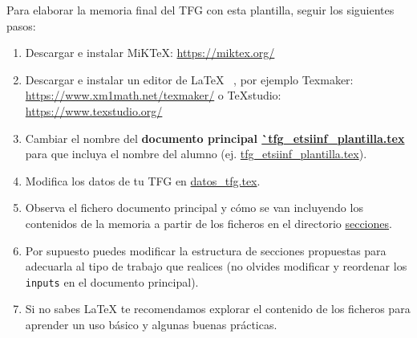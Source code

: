 Para elaborar la memoria final del TFG con esta plantilla, seguir los siguientes pasos:
\begin{enumerate}
\item Descargar e instalar MiKTeX:  \url{https://miktex.org/}
\item Descargar e instalar un editor de \LaTeX~ , por ejemplo Texmaker:
\url{https://www.xm1math.net/texmaker/} o TeXstudio: \url{https://www.texstudio.org/}
\item Cambiar el nombre del \textbf{documento principal
    \url{`tfg_etsiinf_plantilla.tex}} para que incluya el nombre del
  alumno (ej. \url{tfg_etsiinf_plantilla.tex}).
\item Modifica los datos de tu TFG en \url{datos_tfg.tex}.
\item Observa el fichero documento principal y cómo se van incluyendo
  los contenidos de la memoria a partir de los ficheros en el
  directorio \url{secciones}.
\item Por supuesto puedes modificar la estructura de secciones
  propuestas para adecuarla al tipo de trabajo que realices (no
  olvides modificar y reordenar los \texttt{inputs} en el documento
  principal).
\item Si no sabes LaTeX te recomendamos explorar el contenido de los
  ficheros para aprender un uso básico y algunas buenas prácticas.
\end{enumerate}
